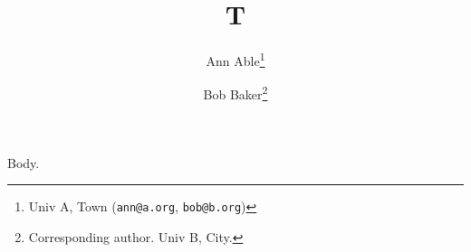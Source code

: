 \documentclass{article}
\newcommand{\email}[1]{\texttt{#1}}
\begin{document}
\title{T}
\author{Ann Able\thanks{Univ A, Town (\email{ann@a.org}, \email{bob@b.org})} \and Bob Baker\thanks{Corresponding author. Univ B, City.}}
\maketitle
Body.
\end{document}
